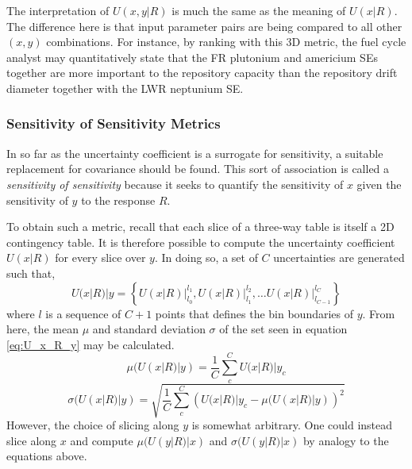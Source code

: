 The interpretation of $U(x,y|R)$ is much the same as the meaning of $U(x|R)$.  
The difference here is that input parameter pairs are being compared to
all other $(x, y)$ combinations.  For instance, by ranking with this 3D metric, the fuel 
cycle analyst may quantitatively state that the FR plutonium and americium SEs
together are more important to the repository capacity than the repository drift diameter 
together with the LWR neptunium SE.


\subsubsection{Sensitivity of Sensitivity Metrics}
\label{cts_sec:sensitivity_of_sensitivity_metrics}

In so far as the uncertainty coefficient is a surrogate for sensitivity, a suitable 
replacement for covariance should be found.
This sort of association is called a \emph{sensitivity of sensitivity} because it seeks
to quantify the sensitivity of $x$ given the sensitivity of  $y$ to the response $R$.

To obtain such a metric, recall that each slice of a three-way table is itself a 2D contingency table.  
It is therefore possible to compute the uncertainty
coefficient $U(x|R)$ for every slice over $y$.  In doing so, a set of $C$ uncertainties are generated 
such that,
\begin{equation}
\label{eq:U_x_R_y}
U(x|R)|y = \left\{ \left.U(x|R)\right|_{l_0}^{l_1}, \left.U(x|R)\right|_{l_1}^{l_2}, \ldots \left.U(x|R)\right|_{l_{C-1}}^{l_C}  \right\}
\end{equation}
where $l$ is a sequence of $C+1$ points that defines the bin boundaries of $y$.
From here, the mean $\mu$ and standard deviation $\sigma$ of the set seen in equation \ref{eq:U_x_R_y} may be 
calculated.
\begin{equation}
\mu(U(x|R)|y) = \frac{1}{C} \sum_c^C U(x|R)|y_c 
\end{equation}
\begin{equation}
\sigma(U(x|R)|y) = \sqrt{ \frac{1}{C} \sum_c^C \left( U(x|R)|y_c - \mu(U(x|R)|y) \right)^2 } 
\end{equation}
However, the choice of slicing along $y$ is somewhat arbitrary.  One could instead slice along $x$ 
and compute $\mu(U(y|R)|x)$ and $\sigma(U(y|R)|x)$
by analogy to the equations above.

